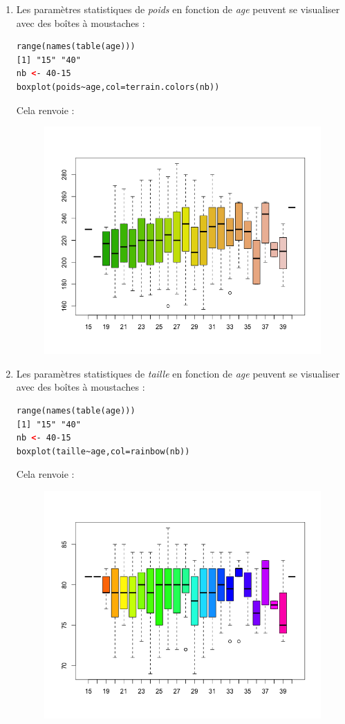 \begin{enumerate}
\item Les paramètres statistiques de \textit{poids} en fonction de \textit{age} peuvent se visualiser avec des boîtes à moustaches :
\begin{lstlisting}[language=html]
range(names(table(age)))
[1] "15" "40"
nb <- 40-15
boxplot(poids~age,col=terrain.colors(nb))
\end{lstlisting}
Cela renvoie :
\begin{figure}[H]\begin{center}\includegraphics[scale=0.4]{ilu/gra86.png}\end{center}\end{figure}
\item Les paramètres statistiques de \textit{taille} en fonction de \textit{age} peuvent se visualiser avec des boîtes à moustaches :
\begin{lstlisting}[language=html]
range(names(table(age)))
[1] "15" "40"
nb <- 40-15
boxplot(taille~age,col=rainbow(nb))
\end{lstlisting}
Cela renvoie :
\begin{figure}[H]\begin{center}\includegraphics[scale=0.4]{ilu/gra87.png}\end{center}\end{figure}

\end{enumerate}
